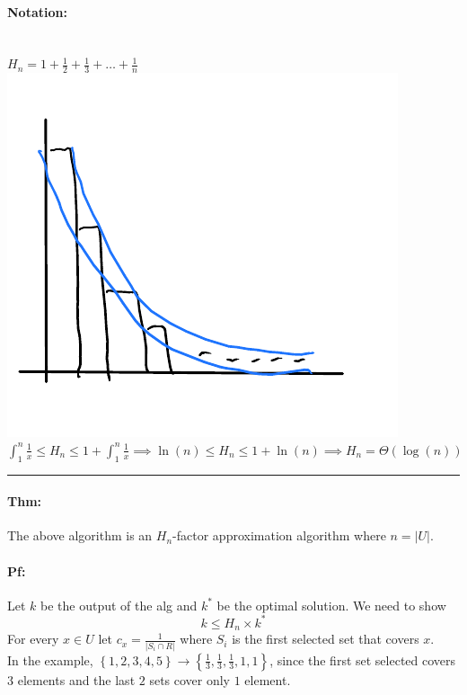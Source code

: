 \documentclass[12 pt]{article}
\begin{document}
          \paragraph{Notation:}~
          \\$H_n = 1 + \frac{1}{2}+\frac{1}{3}+\ldots+\frac{1}{n}$
          \\\includegraphics[width=.9\textwidth]{i161.pdf}
          \\$ \int_1^n \frac{1}{x} \leq H_n \leq 1 + \int_1^n
          \frac{1}{x} \implies \ln(n) \leq H_n \leq 1+\ln (n) \implies
          H_n = \Theta(\log (n))$
          \\ \noindent \rule{\textwidth}{0.5pt}
          \paragraph{Thm:} The above algorithm is an $H_n$-factor
          approximation algorithm where $n=\left|U\right|$.
          \paragraph{Pf:} Let $k$ be the output of the alg and $k^*$
          be the optimal solution. We need to show
          $$k \leq H_n \times k^*$$
          For every $x \in U$ let $c_x = \frac{1}{\left|S_i \cap
              R\right|}$ where $S_i$ is the first selected set that
          covers $x$.
          \\ In the example, $\left\{1,2,3,4,5\right\}\to
          \left\{\frac{1}{3},\frac{1}{3},\frac{1}{3},1,1\right\}$,
          since the first set selected covers $3$ elements and the
          last $2$ sets cover only $1$ element.
\end{document}
